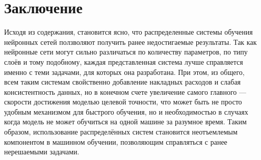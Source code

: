 
\section{Заключение}

Исходя из содержания, становится ясно, что распределенные системы обучения нейронных сетей ползволяют получить ранее недостигаемые результаты. Так как нейронные сети могут сильно различаться по количеству параметров, по типу слоёв и тому подобному, каждая представленная система лучше справляется именно с теми задачами, для которых она разработана. При этом, из общего, всем таким системам свойственно добавление накладных расходов и слабая консистентность данных, но в конечном счете увеличение самого главного — скорости достижения моделью целевой точности, что может быть не просто удобным механизмом для быстрого обучения, но и необходимостью в случаях когда модель не может обучиться на одной машине за разумное время. Таким образом, использование распределённых систем становится неотъемлемым компонентом в машинном обучении, позволяющим справляться с ранее нерешаемыми задачами.
